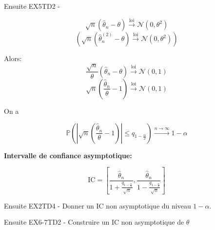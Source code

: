 \exo
\begin{enonce}
Ensuite EX5TD2 -
\end{enonce}
\begin{correction}
\[
\sqrt{n}(\hat{\theta}_n - \theta) \xrightarrow{\text{loi}} \mathcal{N}(0, \theta^2)
\]
\[
\left(\sqrt{n}(\hat{\theta}^{(2)}_n - \theta) \xrightarrow{\text{loi}} \mathcal{N}(0, \theta^2)\right)
\]

Alors:
\[
\frac{\sqrt{n}}{\theta}(\hat{\theta}_n - \theta) \xrightarrow{\text{loi}} \mathcal{N}(0, 1)
\]
\[
\sqrt{n}\left(\frac{\hat{\theta}_n}{\theta} - 1\right) \xrightarrow{\text{loi}} \mathcal{N}(0, 1)
\]

On a

\[
\mathbb{P}\left(\left|\sqrt{n}\left(\frac{\hat{\theta}_n}{\theta} - 1\right)\right| \leq q_{1-\frac{\alpha}{2}}\right) \xrightarrow{n \to \infty} 1 - \alpha
\]

\textbf{Intervalle de confiance asymptotique:}

\[
\text{IC} = \left[\frac{\hat{\theta}_n}{1 + \frac{q_{1-\frac{\alpha}{2}}}{\sqrt{n}}}, \frac{\hat{\theta}_n}{1 - \frac{q_{1-\frac{\alpha}{2}}}{\sqrt{n}}}\right]
\]
\end{correction}

\exo
\begin{enonce}
Ensuite EX2TD4 -
\ques
\ques
\ques
\ques Donner un IC non asymptotique du niveau $1-\alpha$.
\end{enonce}
\begin{correction}
\end{correction}

\exo
\begin{enonce}
Ensuite EX6-7TD2 -
Construire un IC non asymptotique de $\theta$
\end{enonce}
\begin{correction}
\end{correction}


